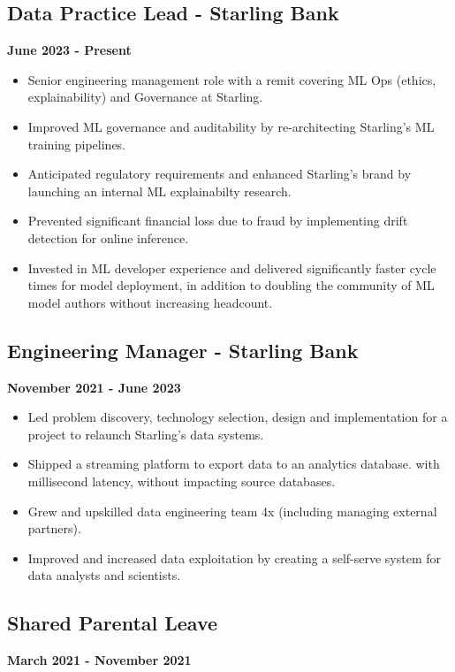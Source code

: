 \documentclass[a4paper]{scrartcl}
\begin{document}
\subsection*{Data Practice Lead - Starling Bank}
\textbf{June 2023 - Present}
\begin{itemize}
	\item Senior engineering management role with a remit covering ML Ops
	      (ethics,
	      explainability) and Governance at Starling.
	\item Improved ML governance and auditability by re-architecting
	      Starling's ML training pipelines.
	\item Anticipated regulatory requirements and enhanced Starling's brand
	      by launching an internal ML explainabilty research.
	\item Prevented significant financial loss due to fraud by implementing
	      drift detection for online inference.
	\item Invested in ML developer experience and delivered significantly
	      faster cycle times for model deployment, in addition to doubling the community
	      of ML model authors without increasing headcount.
\end{itemize}

\subsection*{Engineering Manager - Starling Bank}
\textbf{November 2021 - June 2023}
\begin{itemize}
	\item Led problem discovery, technology selection, design and
	      implementation for a project to relaunch Starling's data systems.
	\item Shipped a streaming platform to export data to an analytics
	      database.
	      with millisecond latency, without impacting source databases.
	\item Grew and upskilled data engineering team 4x (including managing
	      external partners).
	\item Improved and increased data exploitation by creating a self-serve
	      system for data analysts and scientists.
\end{itemize}

\subsection*{Shared Parental Leave}
\textbf{March 2021 - November 2021}
\end{document}
